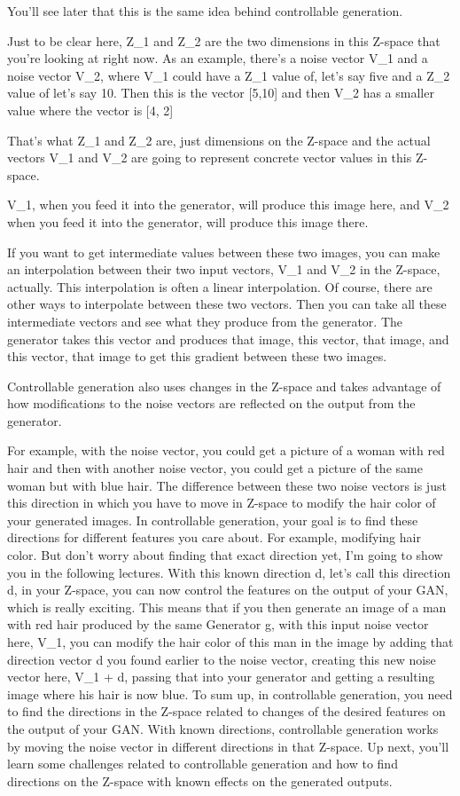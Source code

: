 \documentclass[11pt, onecolumn]{article}
\begin{document}
You'll see later that this is the same idea behind controllable generation.

Just to be clear here, Z_1 and Z_2 are the two dimensions in this Z-space that you're looking at right now.
As an example, there's a noise vector V_1 and a noise vector V_2, where V_1 could have a Z_1 value of,
let's say five and a Z_2 value of let's say 10.
Then this is the vector [5,10] and then V_2 has a smaller value where the vector is [4, 2]

That's what Z_1 and Z_2 are, just dimensions on the Z-space and the actual vectors V_1 and V_2 are going to represent concrete vector values in this Z-space.

V_1, when you feed it into the generator, will produce this image here, and V_2 when you feed it into the generator, will produce this image there.

If you want to get intermediate values between these two images, you can make an interpolation between their two input vectors, V_1 and V_2 in the Z-space, actually.
This interpolation is often a linear interpolation.
Of course, there are other ways to
interpolate between these two vectors.
Then you can take all these intermediate vectors
and see what they produce from the generator.
The generator takes this vector and
produces that image, this vector,
that image, and this vector,
that image to get this gradient between these two images.

Controllable generation also uses changes in the Z-space and takes advantage of how modifications to the noise vectors are reflected on the output from the generator.

For example, with the noise vector,
you could get a picture of a woman with
red hair and then with another noise vector,
you could get a picture of the same
woman but with blue hair.
The difference between these two noise vectors
is just this direction in which you have to
move in Z-space to
modify the hair color of your generated images.
In controllable generation, your goal is to find
these directions for different features you care about.
For example, modifying hair color.
But don't worry about finding that exact direction yet,
I'm going to show you in the following lectures.
With this known direction d,
let's call this direction d,
in your Z-space, you can now
control the features on the output of your GAN,
which is really exciting.
This means that if you then generate an image of
a man with red hair produced by the same Generator g,
with this input noise vector here, V_1,
you can modify the hair color of
this man in the image by adding
that direction vector d you
found earlier to the noise vector,
creating this new noise vector here, V_1 + d,
passing that into your generator and
getting a resulting image where his hair is now blue.
To sum up, in controllable generation,
you need to find the directions in the Z-space related to
changes of the desired features
on the output of your GAN.
With known directions,
controllable generation works by moving
the noise vector in different directions in that Z-space.
Up next, you'll learn
some challenges related to controllable generation and
how to find directions on the Z-space with
known effects on the generated outputs. 
\end{document}
